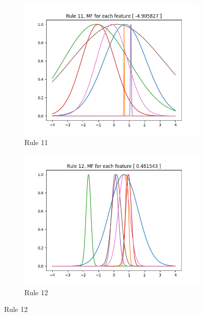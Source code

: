 \documentclass[11pt,a4paper]{article}
\begin{document}
\begin{figure}[htbp]
\begin{subfigure}{\columnwidth}
  \includegraphics[width=\columnwidth,keepaspectratio]{rule-11.png}  
  \caption{Rule 11}
  \label{fig:rules:rule-11}
\end{subfigure}
\begin{subfigure}{\columnwidth}
  \centering
  \includegraphics[width=\columnwidth,keepaspectratio]{rule-12.png}
  \caption{Rule 12}
  \label{fig:rules:rule-12}
\end{subfigure}
\end{figure}
\end{document}
